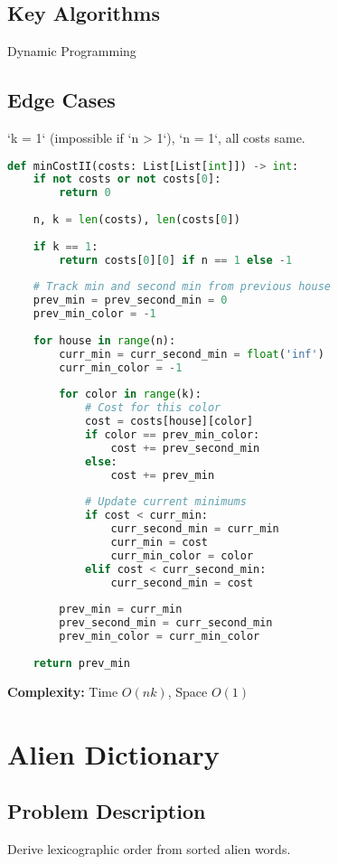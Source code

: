 \documentclass[10pt, a4paper]{article}
\begin{document}
\subsection*{Key Algorithms}
Dynamic Programming

\subsection*{Edge Cases}
`k = 1` (impossible if `n > 1`), `n = 1`, all costs same.

\begin{lstlisting}[language=Python]
def minCostII(costs: List[List[int]]) -> int:
    if not costs or not costs[0]:
        return 0
    
    n, k = len(costs), len(costs[0])
    
    if k == 1:
        return costs[0][0] if n == 1 else -1
    
    # Track min and second min from previous house
    prev_min = prev_second_min = 0
    prev_min_color = -1
    
    for house in range(n):
        curr_min = curr_second_min = float('inf')
        curr_min_color = -1
        
        for color in range(k):
            # Cost for this color
            cost = costs[house][color]
            if color == prev_min_color:
                cost += prev_second_min
            else:
                cost += prev_min
            
            # Update current minimums
            if cost < curr_min:
                curr_second_min = curr_min
                curr_min = cost
                curr_min_color = color
            elif cost < curr_second_min:
                curr_second_min = cost
        
        prev_min = curr_min
        prev_second_min = curr_second_min
        prev_min_color = curr_min_color
    
    return prev_min
\end{lstlisting}
\textbf{Complexity:} Time $O(nk)$, Space $O(1)$

\section{Alien Dictionary}
\subsection*{Problem Description}
Derive lexicographic order from sorted alien words.
\end{document}
